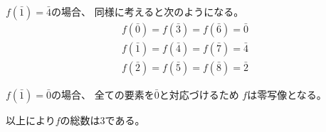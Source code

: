 \documentclass[12pt,b5paper]{ltjsarticle}
\begin{document}
\begin{enumerate}
      $f(\bar{1})=\bar{4}$の場合、
      同様に考えると次のようになる。
      \begin{gather}
       f(\bar{0}) = f(\bar{3}) = f(\bar{6}) = \bar{0}\\
       f(\bar{1}) = f(\bar{4}) = f(\bar{7}) = \bar{4}\\
       f(\bar{2}) = f(\bar{5}) = f(\bar{8}) = \bar{2}
      \end{gather}

      $f(\bar{1})=\bar{0}$の場合、
      全ての要素を$\bar{0}$と対応づけるため
      $f$は零写像となる。

      以上により$f$の総数は3である。

\hrulefill
\end{enumerate}




\hrulefill
\end{document}
